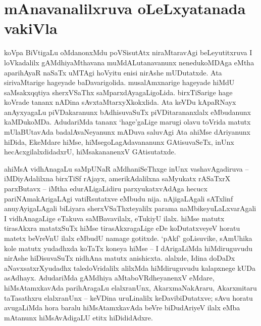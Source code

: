 \makeatletter
\def\@makechapterhead#1{%
  \vspace*{10\p@}%
{\fontsize{13pt}{13pt}\selectfont\raggedright{\bf  bArfbarA vADfR jAkfsanf}\par}
\vspace*{25\p@}%
  {\parindent \z@ \centering \normalfont
    \ifnum \c@secnumdepth >\m@ne
      \if@mainmatter
        {\LARGE\bfseries  #1}\par\nobreak
	\vskip 4pt
      \fi
    \fi
\smallskip 

 \vskip 10\p@  
{\fontsize{12pt}{12pt}\selectfont\raggedleft{anu: \bf pu.ti.na.}\par}
  }
\vskip 40\p@}
\makeatother


\chapter{mAnavanalilxruva oLeLxyatanada vakiVla}\label{chap1}



koVpa BiVtigaLu oMdanonxMdu poVSisutAtx niraMtaravAgi beLeyutitxruva I loVka\-dalilx gAMdhiyaMthavana muMdALutanavanunx nenedukoMDAga eMtha aparihAyaR naSaTx uMTAgi hoVyitu enisi nirAshe mUDutatxde. Ata sirivaMtarige hageyade baDavari\-golida. musalAmxnarige hageyade hiMdU saMsakxqqtiya sherxVSaThx saMparxdA\-yagaLi\-goLida. birxTiSarige hage koVrade tananx nADina sAvxtaMtarxyXkokxlida. Ata keVDu kApaRNayx anAyxyagaLu piVDakaranunx bAdhisuvaSuTx piVDitarananxlalx eMbudanunx kaMDukoMDa. AdudariMda tananx `hage'gaLige marugi olavu toVrida matutx mUlaBUtavAda badalAvaNeyanunx mADuva saluvAgi Ata ahiMse dAriyanunx hiDida, EkeMdare hiMse, hiMsegoLagAdavananunx GAtisuvaSeTx, inUnx hecAcxgilalxdidadxrU, hiMsakananenxV GAtisutatxde.

ahiMsA vidhAnagaLu saMpUNaR aMdhaniSeThxge inUnx vashavAgadiruva -- iMDiyAdalilxna birxTiSf rAjayx, amerikAdalilxna saMyukatx rASaTxrX parxButavx -- iMtha edurALigaLidiru parxyukatxvAdAga hecucx pariNAmakArigaLAgi vatiRsutatxve eMbudu nija. nAjigaLAgali sATxlinf anuyAyigaLAgali biLiyara sherxVSaThxteyalilx parama naMbikeyuLaLxvarAgali I vidhAnagaLige eTakuva saMBavavilalx, eTukiyU ilalx. hiMse matutx tirasAkxra matatxSuTx hiMse tirasAkxragaLige eDe koDutatxveyeV horatu matetx beVreVnU ilalx eMbudU namage gotitxde. `pAkf' goLisuvike, sAmUhika kole matutx yudadhxda koTaTx koneya hiMse -- I dArigaLiMda hiMdiruguvudu nirAshe hiDisuvaSuTx nidhAna matutx anishicxta. alalxde, Idina doDaDx aNavxsatxrXyudadhx taledoVridalilx alilxMda hiMdiruguvudu kalapxnege kUDa asAdhayx. AdudariMda gAMdhiya aMtaboVRdheyanenxV eMdare, hiMsAtamxkavAda parihAragaLu elalxranUnx, AkarxmaNakAraru, Akarxmitaru taTasathxru elalxranUnx -- keVDina uruLinalilx  keDavibiDutatxve; sAvu horatu avugaLiMda hora baralu hiMsAtamxkavAda beVre biDudAriyeV ilalx eMba mAtanunx hiMsAvAdigaLU etitx hiDididAdxre.

